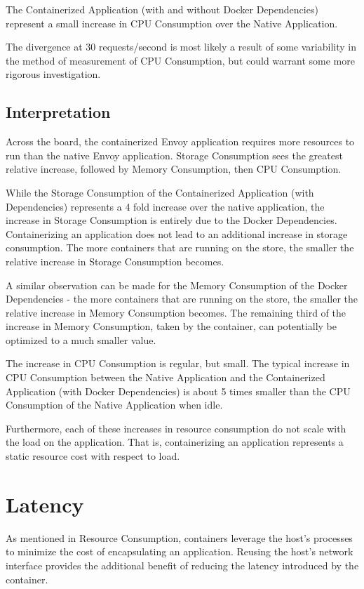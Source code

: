 \documentclass{article}
\begin{document}
The Containerized Application (with and without Docker Dependencies) represent a small increase in CPU Consumption over the Native Application.

The divergence at 30 requests/second is most likely a result of some variability in the method of measurement of CPU Consumption, but could warrant some more rigorous investigation.

\subsection{Interpretation}
Across the board, the containerized Envoy application requires more resources to run than the native Envoy application. Storage Consumption sees the greatest relative increase, followed by Memory Consumption, then CPU Consumption.

While the Storage Consumption of the Containerized Application (with Dependencies) represents a 4 fold increase over the native application, the increase in Storage Consumption is entirely due to the Docker Dependencies. Containerizing an application does not lead to an additional increase in storage consumption. The more containers that are running on the store, the smaller the relative increase in Storage Consumption becomes.

A similar observation can be made for the Memory Consumption of the Docker Dependencies - the more containers that are running on the store, the smaller the relative increase in Memory Consumption becomes. The remaining third of the increase in Memory Consumption, taken by the container, can potentially be optimized to a much smaller value.

The increase in CPU Consumption is regular, but small. The typical increase in CPU Consumption between the Native Application and the Containerized Application (with Docker Dependencies) is about 5 times smaller than the CPU Consumption of the Native Application when idle.

Furthermore, each of these increases in resource consumption do not scale with the load on the application. That is, containerizing an application represents a static resource cost with respect to load.

\section{Latency}
As mentioned in Resource Consumption, containers leverage the host's processes to minimize the cost of encapsulating an application. Reusing the host's network interface provides the additional benefit of reducing the latency introduced by the container.
\end{document}
